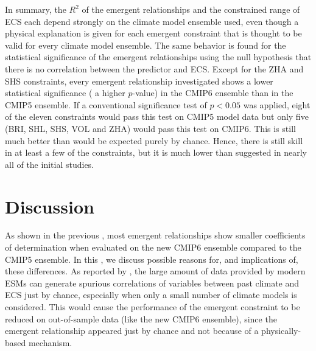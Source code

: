 In summary, the $R^2$ of the emergent relationships and the constrained range
of \ac{ECS} each depend strongly on the climate model ensemble used, even
though a physical explanation is given for each emergent constraint that is
thought to be valid for every climate model ensemble. The same behavior is
found for the statistical significance of the emergent relationships using the
null hypothesis that there is no correlation between the predictor and
\ac{ECS}. Except for the ZHA and SHS constraints, every emergent relationship
investigated shows a lower statistical significance (\ie{} a higher $p$-value)
in the \acs{CMIP}6 ensemble than in the \acs{CMIP}5 ensemble. If a conventional
significance test of $p < 0.05$ was applied, eight of the eleven constraints
would pass this test on \acs{CMIP}5 model data but only five (BRI, SHL, SHS,
VOL and ZHA) would pass this test on \acs{CMIP}6. This is still much better
than would be expected purely by chance. Hence, there is still skill in at
least a few of the constraints, but it is much lower than suggested in nearly
all of the initial studies.


\section{Discussion}
\label{sec:05:discussion}

As shown in the previous ,
most emergent relationships show smaller coefficients of determination when
evaluated on the new \acs{CMIP}6 ensemble compared to the \acs{CMIP}5 ensemble.
In this , we discuss possible reasons for, and
implications of, these differences. As reported by \textcite{Caldwell2014}, the
large amount of data provided by modern \acp{ESM} can generate spurious
correlations of variables between past climate and \ac{ECS} just by chance,
especially when only a small number of climate models is considered. This would
cause the performance of the emergent constraint to be reduced on out-of-sample
data (like the new \acs{CMIP}6 ensemble), since the emergent relationship
appeared just by chance and not because of a physically-based mechanism.

